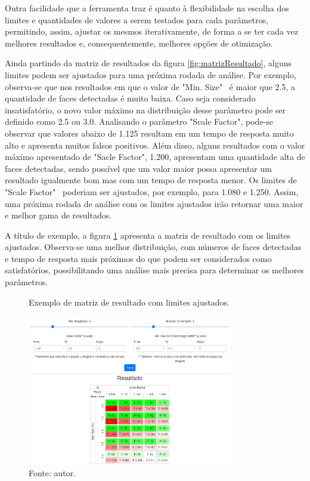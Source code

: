 Outra facilidade que a ferramenta traz é quanto à flexibilidade na escolha dos limites e quantidades de valores a serem testados para cada parâmetros, permitindo, assim, ajustar os mesmos iterativamente, de forma a se ter cada vez melhores resultados e, consequentemente, melhores opções de otimização.

Ainda partindo da matriz de resultados da figura \ref{fig:matrizResultado}, alguns limites podem ser ajustados para uma próxima rodada de análise. Por exemplo, observa-se que nos resultados em que o valor de "Min. Size" \ é maior que 2.5, a quantidade de faces detectadas é muito baixa. Caso seja considerado insatisfatório, o novo valor máximo na distribuição desse parâmetro pode ser definido como 2.5 ou 3.0. Analisando o parâmetro "Scale Factor", pode-se observar que valores abaixo de 1.125 resultam em um tempo de resposta muito alto e apresenta muitos falsos positivos. Além disso, alguns resultados com o valor máximo apresentado de "Sacle Factor", 1.200, apresentam uma quantidade alta de faces detectadas, sendo possível que um valor maior possa apresentar um resultado igualmente bom mas com um tempo de resposta menor. Os limites de "Scale Factor" \ poderiam ser ajustados, por exemplo, para 1.080 e 1.250. Assim, uma próxima rodada de análise com os limites ajustados irão retornar uma maior e melhor gama de resultados.

A título de exemplo, a figura \ref{fig:matrizResultado2} apresenta a matriz de resultado com os limites ajustados. Observa-se uma melhor distribuição, com números de faces detectadas e tempo de resposta mais próximos do que podem ser considerados como satisfatórios, possibilitando uma análise mais precisa para determinar os melhores parâmetros.

\begin{figure}[h]
    \centering
    \caption[Exemplo de matriz de resultado com limites ajustados.]{Exemplo de matriz de resultado com limites ajustados.}
    \includegraphics[width=0.8\textwidth]{Cap3_Desenvolvimento/Figures/exemplo_resultado_matriz_2.jpg}
    \caption*{Fonte: autor.}
    \label{fig:matrizResultado2}
\end{figure}


